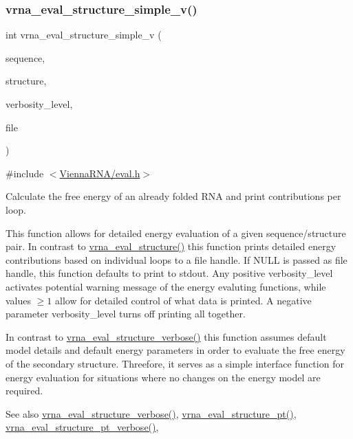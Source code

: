 \subsubsection{\texorpdfstring{vrna\+\_\+eval\+\_\+structure\+\_\+simple\+\_\+v()}{vrna\_eval\_structure\_simple\_v()}}
{\footnotesize\ttfamily int vrna\+\_\+eval\+\_\+structure\+\_\+simple\+\_\+v (\begin{DoxyParamCaption}\item[{const char $\ast$}]{sequence,  }\item[{const char $\ast$}]{structure,  }\item[{int}]{verbosity\+\_\+level,  }\item[{F\+I\+LE $\ast$}]{file }\end{DoxyParamCaption})}



{\ttfamily \#include $<$\mbox{\hyperlink{eval_8h}{Vienna\+R\+N\+A/eval.\+h}}$>$}



Calculate the free energy of an already folded R\+NA and print contributions per loop. 

This function allows for detailed energy evaluation of a given sequence/structure pair. In contrast to \mbox{\hyperlink{group__eval_ga58f199f1438d794a265f3b27fc8ea631}{vrna\+\_\+eval\+\_\+structure()}} this function prints detailed energy contributions based on individual loops to a file handle. If N\+U\+LL is passed as file handle, this function defaults to print to stdout. Any positive {\ttfamily verbosity\+\_\+level} activates potential warning message of the energy evaluting functions, while values $ \ge 1 $ allow for detailed control of what data is printed. A negative parameter {\ttfamily verbosity\+\_\+level} turns off printing all together.

In contrast to \mbox{\hyperlink{group__eval_ga0928d699d310178f84ee2351034e5cb5}{vrna\+\_\+eval\+\_\+structure\+\_\+verbose()}} this function assumes default model details and default energy parameters in order to evaluate the free energy of the secondary structure. Threefore, it serves as a simple interface function for energy evaluation for situations where no changes on the energy model are required.

\begin{DoxySeeAlso}{See also}
\mbox{\hyperlink{group__eval_ga0928d699d310178f84ee2351034e5cb5}{vrna\+\_\+eval\+\_\+structure\+\_\+verbose()}}, \mbox{\hyperlink{group__eval_gadbd09372ddfd7a450bbd590c96a6bfe4}{vrna\+\_\+eval\+\_\+structure\+\_\+pt()}}, \mbox{\hyperlink{group__eval_ga8a517cfeeae8c376ae7b1e0c401d38b4}{vrna\+\_\+eval\+\_\+structure\+\_\+pt\+\_\+verbose()}},
\end{DoxySeeAlso}

